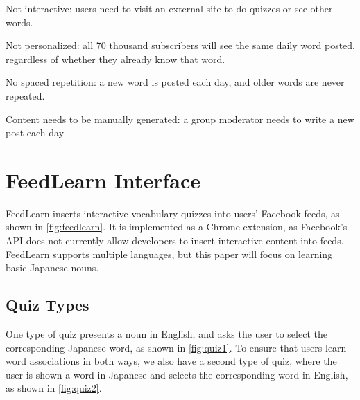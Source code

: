 \documentclass{sigchi}
\begin{document}
\begin{compactitem}
\item Not interactive: users need to visit an external site to do quizzes or see other words.
\item Not personalized: all 70 thousand subscribers will see the same daily word posted, regardless of whether they already know that word.
\item No spaced repetition: a new word is posted each day, and older words are never repeated.
\item Content needs to be manually generated: a group moderator needs to write a new post each day
\end{compactitem}



\section{FeedLearn Interface}

FeedLearn inserts interactive vocabulary quizzes into users' Facebook feeds, as shown in \autoref{fig:feedlearn}. It is implemented as a Chrome extension, as Facebook's API does not currently allow developers to insert interactive content into feeds. FeedLearn supports multiple languages, but this paper will focus on learning basic Japanese nouns. %

\subsection{Quiz Types}

One type of quiz presents a noun in English, and asks the user to select the corresponding Japanese word, as shown in \autoref{fig:quiz1}. To ensure that users learn word associations in both ways, we also have a second type of quiz, where the user is shown a word in Japanese and selects the corresponding word in English, as shown in \autoref{fig:quiz2}.
\end{document}
